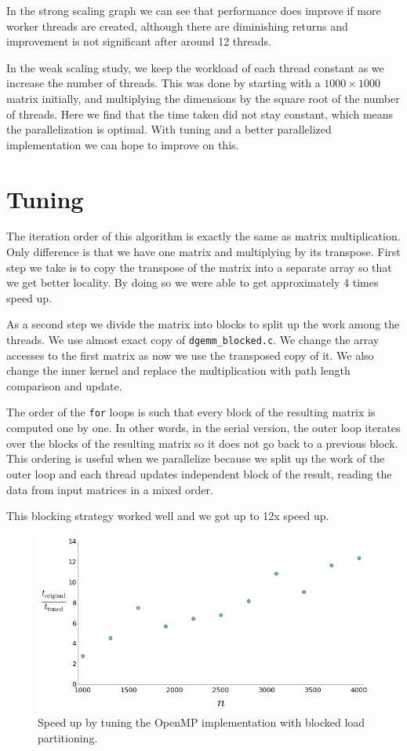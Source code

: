 \documentclass{article}
\begin{document}
In the strong scaling graph we can see that performance does improve if more worker threads are created, although there are diminishing returns and improvement is not significant after around 12 threads.

In the weak scaling study, we keep the workload of each thread constant as we increase the number of threads. This was done by starting with a $1000 \times 1000$ matrix initially, and multiplying the dimensions by the square root of the number of threads. Here we find that the time taken did not stay constant, which means the parallelization is optimal. With tuning and a better parallelized implementation we can hope to improve on this.

\section{Tuning}

The iteration order of this algorithm is exactly the same as matrix multiplication. Only difference is that we have one matrix and multiplying by its transpose. First step we take is to copy the transpose of the matrix into a separate array so that we get better locality. By doing so we were able to get approximately 4 times speed up. 

As a second step we divide the matrix into blocks to split up the work among the threads. We use almost exact copy of \texttt{dgemm\_blocked.c}. We change the array accesses to the first matrix as now we use the transposed copy of it. We also change the inner kernel and replace the multiplication with path length comparison and update.

The order of the \texttt{for} loops is such that every block of the resulting matrix is computed one by one. In other words, in the serial version, the outer loop iterates over the blocks of the resulting matrix so it does not go back to a previous block. This ordering is useful when we parallelize because we split up the work of the outer loop and each thread updates independent block of the result, reading the data from input matrices in a mixed order.

This blocking strategy worked well and we got up to 12x speed up. 

 \begin{figure}[here]
  \centering
  \includegraphics[width=0.7\linewidth]{tunedPerformance.png}
  \caption{Speed up by tuning the OpenMP implementation with blocked load partitioning.}
  \label{tunedPerformance}
\end{figure}

\end{document}
